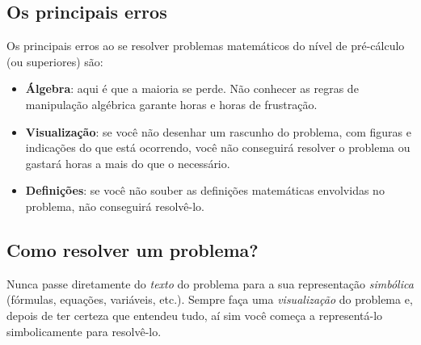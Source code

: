 \documentclass[pdftex, brazil, 12pt, twoside]{article}
\begin{document}
\subsection{Os principais erros}
\label{notas-principais-erros}

Os principais erros ao se resolver problemas matemáticos do nível de pré-cálculo
(ou superiores) são:

\begin{itemize}
\item \textbf{Álgebra}: aqui é que a maioria se perde. Não conhecer as regras de
  manipulação algébrica garante horas e horas de frustração.
\item \textbf{Visualização}: se você não desenhar um rascunho do problema, com
  figuras e indicações do que está ocorrendo, você não conseguirá resolver o problema
  ou gastará horas a mais do que o necessário.
\item \textbf{Definições}: se você não souber as definições matemáticas envolvidas
  no problema, não conseguirá resolvê-lo.
\end{itemize}

\subsection{Como resolver um problema?}
\label{notas-como-resolver}

Nunca passe diretamente do \emph{texto} do problema para a sua representação
\emph{simbólica} (fórmulas, equações, variáveis, etc.). Sempre faça uma
\emph{visualização} do problema e, depois de ter certeza que entendeu tudo,
aí sim você começa a representá-lo simbolicamente para resolvê-lo.
\end{document}
